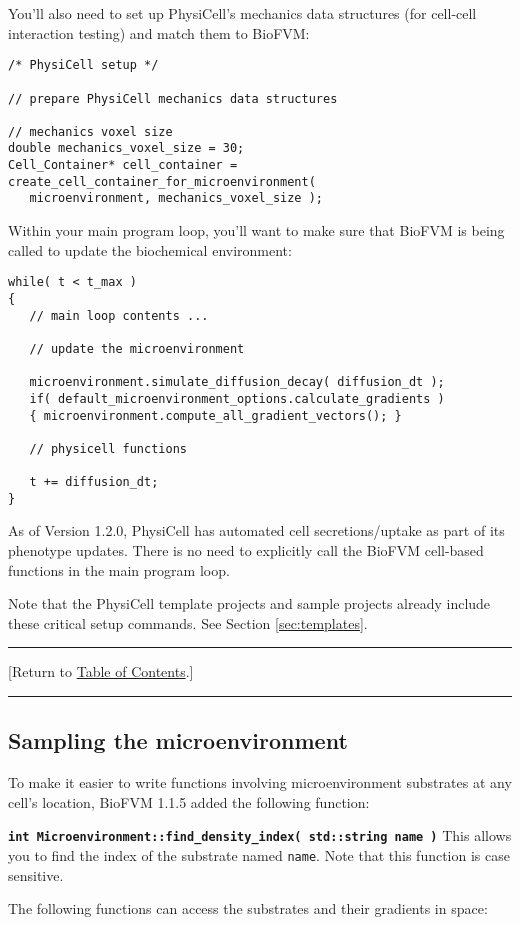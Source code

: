 \documentclass[12pt]{article}
\renewcommand{\v}{\verb}
\newcommand{\smallcode}[1]{\textbf{\texttt{#1}}}
\newcommand{\TOClink}{\begin{center}\hrule\vskip-10pt\phantom{.}\hfill[Return to \hyperlink{TOC}{Table of Contents}.]\hfill\phantom{.}\vskip3pt\hrule\end{center}}
\begin{document}
You'll also need to set up PhysiCell's mechanics data structures (for cell-cell interaction testing) and match them to BioFVM: 

\begin{verbatim}
/* PhysiCell setup */ 

// prepare PhysiCell mechanics data structures 

// mechanics voxel size 
double mechanics_voxel_size = 30; 
Cell_Container* cell_container = create_cell_container_for_microenvironment( 
   microenvironment, mechanics_voxel_size );
\end{verbatim}

Within your main program loop, you'll want to make sure that BioFVM is being called to 
update the biochemical environment: 

\begin{verbatim}
while( t < t_max )
{
   // main loop contents ... 

   // update the microenvironment
  
   microenvironment.simulate_diffusion_decay( diffusion_dt );
   if( default_microenvironment_options.calculate_gradients )
   { microenvironment.compute_all_gradient_vectors(); }   
   
   // physicell functions 
  
   t += diffusion_dt; 
}
\end{verbatim}

As of Version 1.2.0, PhysiCell has automated cell secretions/uptake as part of its phenotype 
updates. There is no need to explicitly call the BioFVM cell-based functions in the main program loop.

Note that the PhysiCell template projects and sample projects already include these critical setup commands. 
See Section \ref{sec:templates}. 

\TOClink 

\subsection{Sampling the microenvironment}
\label{sec:sample_microenvironment}
To make it easier to write functions involving microenvironment substrates 
at any cell's location, BioFVM 1.1.5 added the following function: 

\smallcode{int Microenvironment::find\_density\_index( std::string name )}
This allows you to find the index of the substrate named \v|name|. Note that this 
function is case sensitive. 

The following functions can access the substrates and their gradients in
space: 
\end{document}
